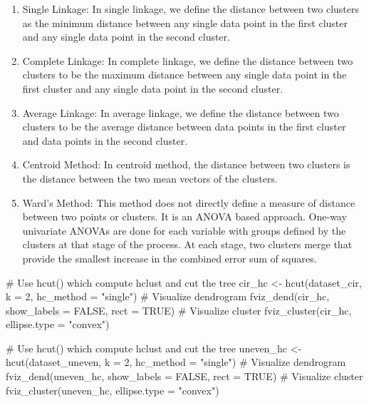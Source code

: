 \documentclass[
  letterpaper,
  DIV=11,
  numbers=noendperiod]{scrreprt}
\newenvironment{Shaded}{\begin{snugshade}}{\end{snugshade}}
\newcommand{\NormalTok}[1]{\textcolor[rgb]{0.00,0.23,0.31}{#1}}
\begin{document}
\begin{enumerate}
\def\labelenumi{\arabic{enumi}.}
\item
  Single Linkage: In single linkage, we define the distance between two
  clusters as the minimum distance between any single data point in the
  first cluster and any single data point in the second cluster.
\item
  Complete Linkage: In complete linkage, we define the distance between
  two clusters to be the maximum distance between any single data point
  in the first cluster and any single data point in the second cluster.
\item
  Average Linkage: In average linkage, we define the distance between
  two clusters to be the average distance between data points in the
  first cluster and data points in the second cluster.
\item
  Centroid Method: In centroid method, the distance between two clusters
  is the distance between the two mean vectors of the clusters.
\item
  Ward's Method: This method does not directly define a measure of
  distance between two points or clusters. It is an ANOVA based
  approach. One-way univariate ANOVAs are done for each variable with
  groups defined by the clusters at that stage of the process. At each
  stage, two clusters merge that provide the smallest increase in the
  combined error sum of squares.
\end{enumerate}

\begin{Shaded}
\begin{Highlighting}[]
\NormalTok{\# Use hcut() which compute hclust and cut the tree}
\NormalTok{cir\_hc \textless{}{-} hcut(dataset\_cir, k = 2, hc\_method = "single")}
\NormalTok{\# Visualize dendrogram}
\NormalTok{fviz\_dend(cir\_hc, show\_labels = FALSE, rect = TRUE)}
\NormalTok{\# Visualize cluster}
\NormalTok{fviz\_cluster(cir\_hc, ellipse.type = "convex")}
\end{Highlighting}
\end{Shaded}

\begin{Shaded}
\begin{Highlighting}[]
\NormalTok{\# Use hcut() which compute hclust and cut the tree}
\NormalTok{uneven\_hc \textless{}{-} hcut(dataset\_uneven, k = 2, hc\_method = "single")}
\NormalTok{\# Visualize dendrogram}
\NormalTok{fviz\_dend(uneven\_hc, show\_labels = FALSE, rect = TRUE)}
\NormalTok{\# Visualize cluster}
\NormalTok{fviz\_cluster(uneven\_hc, ellipse.type = "convex")}
\end{Highlighting}
\end{Shaded}
\end{document}

